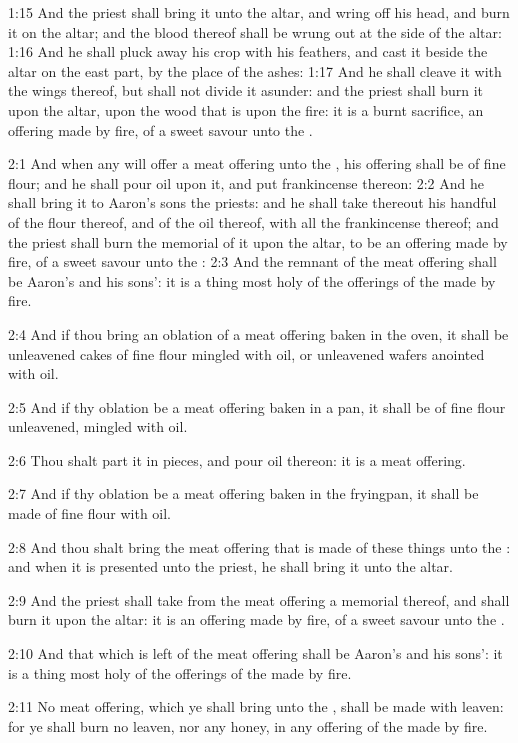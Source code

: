 1:15 And the priest shall bring it unto the altar, and wring off his
head, and burn it on the altar; and the blood thereof shall be wrung
out at the side of the altar: 1:16 And he shall pluck away his crop
with his feathers, and cast it beside the altar on the east part, by
the place of the ashes: 1:17 And he shall cleave it with the wings
thereof, but shall not divide it asunder: and the priest shall burn it
upon the altar, upon the wood that is upon the fire: it is a burnt
sacrifice, an offering made by fire, of a sweet savour unto the \LORD.

2:1 And when any will offer a meat offering unto the \LORD, his
offering shall be of fine flour; and he shall pour oil upon it, and
put frankincense thereon: 2:2 And he shall bring it to Aaron's sons
the priests: and he shall take thereout his handful of the flour
thereof, and of the oil thereof, with all the frankincense thereof;
and the priest shall burn the memorial of it upon the altar, to be an
offering made by fire, of a sweet savour unto the \LORD: 2:3 And the
remnant of the meat offering shall be Aaron's and his sons': it is a
thing most holy of the offerings of the \LORD made by fire.

2:4 And if thou bring an oblation of a meat offering baken in the
oven, it shall be unleavened cakes of fine flour mingled with oil, or
unleavened wafers anointed with oil.

2:5 And if thy oblation be a meat offering baken in a pan, it shall be
of fine flour unleavened, mingled with oil.

2:6 Thou shalt part it in pieces, and pour oil thereon: it is a meat
offering.

2:7 And if thy oblation be a meat offering baken in the fryingpan, it
shall be made of fine flour with oil.

2:8 And thou shalt bring the meat offering that is made of these
things unto the \LORD: and when it is presented unto the priest, he
shall bring it unto the altar.

2:9 And the priest shall take from the meat offering a memorial
thereof, and shall burn it upon the altar: it is an offering made by
fire, of a sweet savour unto the \LORD.

2:10 And that which is left of the meat offering shall be Aaron's and
his sons': it is a thing most holy of the offerings of the \LORD made
by fire.

2:11 No meat offering, which ye shall bring unto the \LORD, shall be
made with leaven: for ye shall burn no leaven, nor any honey, in any
offering of the \LORD made by fire.

